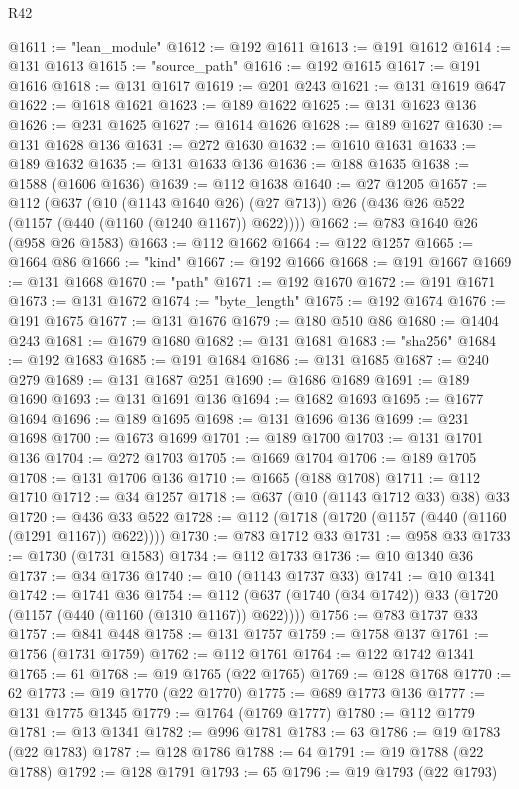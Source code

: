 \begin{lexlean}{R42}
\begin{coremodule}
@1611 := "lean_module"
@1612 := @192 @1611
@1613 := @191 @1612
@1614 := @131 @1613
@1615 := "source_path"
@1616 := @192 @1615
@1617 := @191 @1616
@1618 := @131 @1617
@1619 := @201 @243
@1621 := @131 @1619 @647
@1622 := @1618 @1621
@1623 := @189 @1622
@1625 := @131 @1623 @136
@1626 := @231 @1625
@1627 := @1614 @1626
@1628 := @189 @1627
@1630 := @131 @1628 @136
@1631 := @272 @1630
@1632 := @1610 @1631
@1633 := @189 @1632
@1635 := @131 @1633 @136
@1636 := @188 @1635
@1638 := @1588 (@1606 @1636)
@1639 := @112 @1638
@1640 := @27 @1205
@1657 := @112
    (@637
      (@10 (@1143 @1640 @26) (@27 @713))
      @26
      (@436 @26 @522 (@1157 (@440 (@1160 (@1240 @1167)) @622))))
@1662 := @783 @1640 @26 (@958 @26 @1583)
@1663 := @112 @1662
@1664 := @122 @1257
@1665 := @1664 @86
@1666 := "kind"
@1667 := @192 @1666
@1668 := @191 @1667
@1669 := @131 @1668
@1670 := "path"
@1671 := @192 @1670
@1672 := @191 @1671
@1673 := @131 @1672
@1674 := "byte_length"
@1675 := @192 @1674
@1676 := @191 @1675
@1677 := @131 @1676
@1679 := @180 @510 @86
@1680 := @1404 @243
@1681 := @1679 @1680
@1682 := @131 @1681
@1683 := "sha256"
@1684 := @192 @1683
@1685 := @191 @1684
@1686 := @131 @1685
@1687 := @240 @279
@1689 := @131 @1687 @251
@1690 := @1686 @1689
@1691 := @189 @1690
@1693 := @131 @1691 @136
@1694 := @1682 @1693
@1695 := @1677 @1694
@1696 := @189 @1695
@1698 := @131 @1696 @136
@1699 := @231 @1698
@1700 := @1673 @1699
@1701 := @189 @1700
@1703 := @131 @1701 @136
@1704 := @272 @1703
@1705 := @1669 @1704
@1706 := @189 @1705
@1708 := @131 @1706 @136
@1710 := @1665 (@188 @1708)
@1711 := @112 @1710
@1712 := @34 @1257
@1718 := @637 (@10 (@1143 @1712 @33) @38) @33
@1720 := @436 @33 @522
@1728 := @112 (@1718 (@1720 (@1157 (@440 (@1160 (@1291 @1167)) @622))))
@1730 := @783 @1712 @33
@1731 := @958 @33
@1733 := @1730 (@1731 @1583)
@1734 := @112 @1733
@1736 := @10 @1340 @36
@1737 := @34 @1736
@1740 := @10 (@1143 @1737 @33)
@1741 := @10 @1341
@1742 := @1741 @36
@1754 := @112 (@637 (@1740 (@34 @1742)) @33 (@1720 (@1157 (@440 (@1160 (@1310 @1167)) @622))))
@1756 := @783 @1737 @33
@1757 := @841 @448
@1758 := @131 @1757
@1759 := @1758 @137
@1761 := @1756 (@1731 @1759)
@1762 := @112 @1761
@1764 := @122 @1742 @1341
@1765 := 61
@1768 := @19 @1765 (@22 @1765)
@1769 := @128 @1768
@1770 := 62
@1773 := @19 @1770 (@22 @1770)
@1775 := @689 @1773 @136
@1777 := @131 @1775 @1345
@1779 := @1764 (@1769 @1777)
@1780 := @112 @1779
@1781 := @13 @1341
@1782 := @996 @1781
@1783 := 63
@1786 := @19 @1783 (@22 @1783)
@1787 := @128 @1786
@1788 := 64
@1791 := @19 @1788 (@22 @1788)
@1792 := @128 @1791
@1793 := 65
@1796 := @19 @1793 (@22 @1793)

\end{coremodule}
\end{lexlean}
